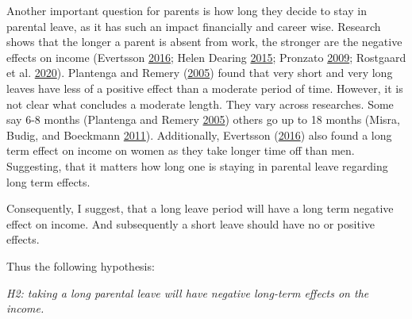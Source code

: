 \documentclass[
  11pt,
]{article}
\begin{document}
Another important question for parents is how long they decide to stay in parental leave, as it has such an impact financially and career wise.
Research shows that the longer a parent is absent from work, the stronger are the negative effects on income (Evertsson \protect\hyperlink{ref-evertsson_parental_2016}{2016}; Helen Dearing \protect\hyperlink{ref-helen_dearing_does_2015}{2015}; Pronzato \protect\hyperlink{ref-pronzato_return_2009}{2009}; Rostgaard et al. \protect\hyperlink{ref-rostgaard_parental_2020}{2020}). Plantenga and Remery (\protect\hyperlink{ref-plantenga_reconciliation_2005}{2005}) found that very short and very long leaves have less of a positive effect than a moderate period of time.
However, it is not clear what concludes a moderate length. They vary across researches. Some say 6-8 months (Plantenga and Remery \protect\hyperlink{ref-plantenga_reconciliation_2005}{2005}) others go up to 18 months (Misra, Budig, and Boeckmann \protect\hyperlink{ref-misra_work-family_2011}{2011}). Additionally, Evertsson (\protect\hyperlink{ref-evertsson_parental_2016}{2016}) also found a long term effect on income on women as they take longer time off than men. Suggesting, that it matters how long one is staying in parental leave regarding long term effects.

Consequently, I suggest, that a long leave period will have a long term negative effect on income. And subsequently a short leave should have no or positive effects.

Thus the following hypothesis:

\emph{H2: taking a long parental leave will have negative long-term effects on the income.}
\end{document}
